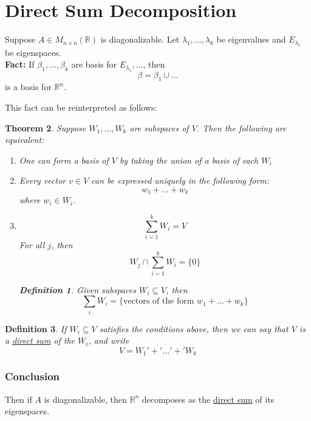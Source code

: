 \documentclass{article}
\newtheorem{theorem}{Theorem}[section]
\newtheorem{definition}[theorem]{Definition}
\newtheorem{one minute paper}[theorem]{One Minute Paper}
\begin{document}
\section*{Direct Sum Decomposition}

Suppose $A \in M_{n\times n}(\mathbb{R})$ is diagonalizable. Let $\lambda_1, \dots, \lambda_k$ be eigenvalues and $E_{\lambda_i}$ be eigenspaces. \\
\textbf{Fact:} If $\beta_1, \dots, \beta_k$ are basis for $E_{\lambda_1}, \dots$, then 
\begin{equation}
    \beta = \beta_1 \cup \dots 
\end{equation}
is a basis for $\mathbb{R}^n$. 

This fact can be reinterpreted as follows:

\begin{theorem}
    Suppose $W_1, \dots, W_k$ are subspaces of $V$. Then the following are equivalent:
    \begin{enumerate}
        \item One can form a basis of $V$ by taking the union of a basis of each $W_i$
        \item Every vector $v \in V$ can be expressed uniquely in the following form: 
        \begin{equation}
            w_1 + \dots + w_k
        \end{equation}
        where $w_i \in W_i$. 
        \item \begin{equation}
            \sum_{i=1}^{k}W_i = V
        \end{equation}
        For all $j$, then 
        \begin{equation}
            W_j \cap \sum_{i=1}^{k}W_i = \{0\}
        \end{equation}
        \begin{definition}
            Given subspaces $W_i \subseteq V$, then 
            \begin{equation}
                \sum_i W_i = \{\text{vectors of the form $w_1 + \dots + w_k$}\}
            \end{equation}
        \end{definition}
    \end{enumerate}
\end{theorem}

\begin{definition}
    If $W_i \subseteq V$ satisfies the conditions above, then we can say that $V$ is a \underline{direct sum} of the $W_i$, and write 
    \begin{equation}
        V = W_1 '+' \dots '+' W_k
    \end{equation}
\end{definition}

\subsubsection*{Conclusion}

Then if $A$ is diagonalizable, then $\mathbb{R}^n$ decomposes as the \underline{direct sum} of its eigenspaces. 
\end{document}
